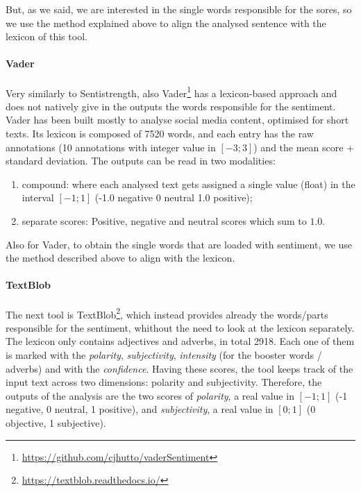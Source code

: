 But, as we said, we are interested in the single words responsible for the sores, so we use the method explained above to align the analysed sentence with the lexicon of this tool.

\paragraph{Vader}
Very similarly to Sentistrength, also Vader\footnote{\url{https://github.com/cjhutto/vaderSentiment}} has a lexicon-based approach and does not natively give in the outputs the words responsible for the sentiment. Vader has been built mostly to analyse social media content, optimised for short texts.
Its lexicon is composed of 7520 words, and each entry has the raw annotations (10 annotations with integer value in $[-3;3]$) and the mean score + standard deviation.
The outputs can be read in two modalities:
\begin{enumerate}
    \item compound: where each analysed text gets assigned a single value (float) in the interval $[-1;1]$ (-1.0 negative 0 neutral 1.0 positive);
    \item separate scores: Positive, negative and neutral scores which sum to $1.0$.
\end{enumerate}

Also for Vader, to obtain the single words that are loaded with sentiment, we use the method described above to align with the lexicon.



\paragraph{TextBlob}
The next tool is TextBlob\footnote{\url{ https://textblob.readthedocs.io/}}, which instead provides already the words/parts responsible for the sentiment, whithout the need to look at the lexicon separately.
The lexicon only contains adjectives and adverbs, in total 2918. Each one of them is marked with the \emph{polarity}, \emph{subjectivity}, \emph{intensity} (for the booster words / adverbs) %
and with the \emph{confidence}. Having these scores, the tool keeps track of the input text across two dimensions: polarity and subjectivity.
Therefore, the outputs of the analysis are the two scores of \emph{polarity}, a real value in $[-1;1]$ (-1 negative, 0 neutral, 1 positive), and \emph{subjectivity}, a real value in $[0;1]$ (0 objective, 1 subjective).

